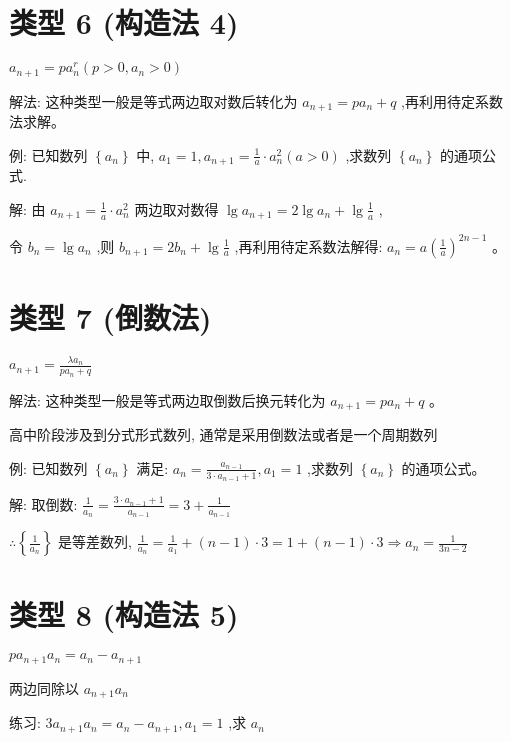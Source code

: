 \documentclass[10pt,cn]{elegantbook}
\begin{document}
\section{类型 6 (构造法 4)} \({a}_{n + 1} = p{a}_{n}^{r}\left( {p > 0,{a}_{n} > 0}\right)\)

解法: 这种类型一般是等式两边取对数后转化为 \({a}_{n + 1} = p{a}_{n} + q\) ,再利用待定系数法求解。

例: 已知数列 \(\left\{ {a}_{n}\right\}\) 中, \({a}_{1} = 1,{a}_{n + 1} = \frac{1}{a} \cdot {a}_{n}^{2}\left( {a > 0}\right)\) ,求数列 \(\left\{ {a}_{n}\right\}\) 的通项公式.

解: 由 \({a}_{n + 1} = \frac{1}{a} \cdot {a}_{n}^{2}\) 两边取对数得 \(\lg {a}_{n + 1} = 2\lg {a}_{n} + \lg \frac{1}{a}\) ,

令 \({b}_{n} = \lg {a}_{n}\) ,则 \({b}_{n + 1} = 2{b}_{n} + \lg \frac{1}{a}\) ,再利用待定系数法解得: \({a}_{n} = a{\left( \frac{1}{a}\right) }^{{2n} - 1}\) 。

\section{类型 7 (倒数法)} \({a}_{n + 1} = \frac{\lambda {a}_{n}}{p{a}_{n} + q}\)

解法: 这种类型一般是等式两边取倒数后换元转化为 \({a}_{n + 1} = p{a}_{n} + q\) 。

高中阶段涉及到分式形式数列, 通常是采用倒数法或者是一个周期数列

例: 已知数列 \(\left\{ {a}_{n}\right\}\) 满足: \({a}_{n} = \frac{{a}_{n - 1}}{3 \cdot {a}_{n - 1} + 1},{a}_{1} = 1\) ,求数列 \(\left\{ {a}_{n}\right\}\) 的通项公式。

解: 取倒数: \(\frac{1}{{a}_{n}} = \frac{3 \cdot {a}_{n - 1} + 1}{{a}_{n - 1}} = 3 + \frac{1}{{a}_{n - 1}}\)

\(\therefore \left\{ \frac{1}{{a}_{n}}\right\}\) 是等差数列, \(\frac{1}{{a}_{n}} = \frac{1}{{a}_{1}} + \left( {n - 1}\right) \cdot 3 = 1 + \left( {n - 1}\right) \cdot 3 \Rightarrow {a}_{n} = \frac{1}{{3n} - 2}\)

\section{类型 8 (构造法 5)} \(p{a}_{n + 1}{a}_{n} = {a}_{n} - {a}_{n + 1}\)

两边同除以 \({a}_{n + 1}{a}_{n}\)

练习: \(3{a}_{n + 1}{a}_{n} = {a}_{n} - {a}_{n + 1},{a}_{1} = 1\) ,求 \({a}_{n}\)
\end{document}
